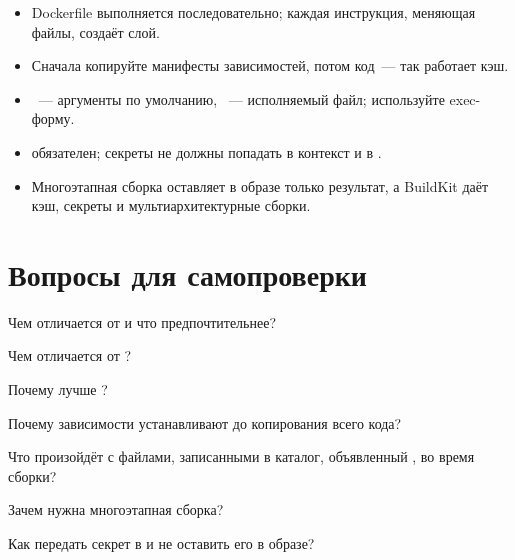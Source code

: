 \begin{summarybox}
\begin{itemize}
  \item Dockerfile выполняется последовательно; каждая инструкция,
        меняющая файлы, создаёт слой.
  \item Сначала копируйте манифесты зависимостей, потом код~---
        так работает кэш.
  \item {}~--- аргументы по умолчанию, ~---
        исполняемый файл; используйте exec-форму.
  \item {} обязателен; секреты не должны попадать
        в контекст и в .
  \item Многоэтапная сборка оставляет в образе только результат,
        а BuildKit даёт кэш, секреты и мультиархитектурные сборки.
\end{itemize}
\end{summarybox}

\section*{Вопросы для самопроверки}
\begin{selfcheck}
  \item Чем  отличается от  и что предпочтительнее?
  \item Чем  отличается от ?
  \item Почему  лучше ?
  \item Почему зависимости устанавливают до копирования всего кода?
  \item Что произойдёт с файлами, записанными в каталог, объявленный
        , во время сборки?
  \item Зачем нужна многоэтапная сборка?
  \item Как передать секрет в  и не оставить его в образе?
\end{selfcheck}
